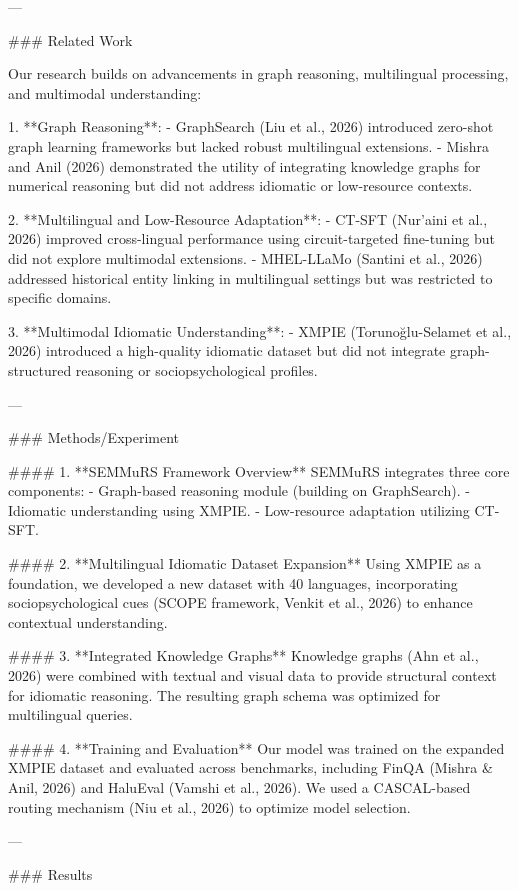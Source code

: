 ---

### Related Work

Our research builds on advancements in graph reasoning, multilingual processing, and multimodal understanding:

1. **Graph Reasoning**:
   - GraphSearch (Liu et al., 2026) introduced zero-shot graph learning frameworks but lacked robust multilingual extensions.
   - Mishra and Anil (2026) demonstrated the utility of integrating knowledge graphs for numerical reasoning but did not address idiomatic or low-resource contexts.

2. **Multilingual and Low-Resource Adaptation**:
   - CT-SFT (Nur’aini et al., 2026) improved cross-lingual performance using circuit-targeted fine-tuning but did not explore multimodal extensions.
   - MHEL-LLaMo (Santini et al., 2026) addressed historical entity linking in multilingual settings but was restricted to specific domains.

3. **Multimodal Idiomatic Understanding**:
   - XMPIE (Torunoğlu-Selamet et al., 2026) introduced a high-quality idiomatic dataset but did not integrate graph-structured reasoning or sociopsychological profiles.

---

### Methods/Experiment

#### 1. **SEMMuRS Framework Overview**
SEMMuRS integrates three core components:
   - Graph-based reasoning module (building on GraphSearch).
   - Idiomatic understanding using XMPIE.
   - Low-resource adaptation utilizing CT-SFT.

#### 2. **Multilingual Idiomatic Dataset Expansion**
Using XMPIE as a foundation, we developed a new dataset with 40 languages, incorporating sociopsychological cues (SCOPE framework, Venkit et al., 2026) to enhance contextual understanding.

#### 3. **Integrated Knowledge Graphs**
Knowledge graphs (Ahn et al., 2026) were combined with textual and visual data to provide structural context for idiomatic reasoning. The resulting graph schema was optimized for multilingual queries.

#### 4. **Training and Evaluation**
Our model was trained on the expanded XMPIE dataset and evaluated across benchmarks, including FinQA (Mishra & Anil, 2026) and HaluEval (Vamshi et al., 2026). We used a CASCAL-based routing mechanism (Niu et al., 2026) to optimize model selection.

---

### Results

